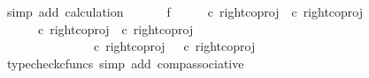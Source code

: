 \begin{isabellebody}
\ {\isacharparenleft}{\kern0pt}simp\ add{\isacharcolon}{\kern0pt}\ calculation{\isacharparenright}{\kern0pt}\isanewline
\ \ \isamarkupfalse%
\isanewline
\ \ \isamarkupfalse%
\ f{}{\isacharcolon}{\kern0pt}\ {\isachardoublequoteopen}{\isasymlangle}{\isasymt}{\isacharcomma}{\kern0pt}{\isasymt}{\isasymrangle}\ {\isasymamalg}\ {\isasymlangle}{\isasymt}{\isacharcomma}{\kern0pt}{\isasymf}{\isasymrangle}\ {\isasymamalg}\ {\isasymlangle}{\isasymf}{\isacharcomma}{\kern0pt}{\isasymt}{\isasymrangle}\ {\isasymcirc}\isactrlsub c\ {\isacharparenleft}{\kern0pt}right{\isacharunderscore}{\kern0pt}coproj\ {\isasymone}\ {\isacharparenleft}{\kern0pt}{\isasymone}{\isasymCoprod}{\isasymone}{\isacharparenright}{\kern0pt}{\isasymcirc}\isactrlsub c\ right{\isacharunderscore}{\kern0pt}coproj\ {\isasymone}\ {\isasymone}{\isacharparenright}{\kern0pt}\ {\isacharequal}{\kern0pt}\ {\isasymlangle}{\isasymf}{\isacharcomma}{\kern0pt}{\isasymt}{\isasymrangle}{\isachardoublequoteclose}\isanewline
\ \ \isamarkupfalse%
{\isacharminus}{\kern0pt}\ \isanewline
\ \ \ \ \isamarkupfalse%
\ {\isachardoublequoteopen}{\isasymlangle}{\isasymt}{\isacharcomma}{\kern0pt}{\isasymt}{\isasymrangle}\ {\isasymamalg}\ {\isasymlangle}{\isasymt}{\isacharcomma}{\kern0pt}{\isasymf}{\isasymrangle}\ {\isasymamalg}\ {\isasymlangle}{\isasymf}{\isacharcomma}{\kern0pt}{\isasymt}{\isasymrangle}\ {\isasymcirc}\isactrlsub c\ {\isacharparenleft}{\kern0pt}right{\isacharunderscore}{\kern0pt}coproj\ {\isasymone}\ {\isacharparenleft}{\kern0pt}{\isasymone}{\isasymCoprod}{\isasymone}{\isacharparenright}{\kern0pt}{\isasymcirc}\isactrlsub c\ right{\isacharunderscore}{\kern0pt}coproj\ {\isasymone}\ {\isasymone}{\isacharparenright}{\kern0pt}\ {\isacharequal}{\kern0pt}\ \isanewline
\ \ \ \ \ \ \ \ \ \ {\isacharparenleft}{\kern0pt}{\isasymlangle}{\isasymt}{\isacharcomma}{\kern0pt}{\isasymt}{\isasymrangle}\ {\isasymamalg}\ {\isasymlangle}{\isasymt}{\isacharcomma}{\kern0pt}{\isasymf}{\isasymrangle}\ {\isasymamalg}\ {\isasymlangle}{\isasymf}{\isacharcomma}{\kern0pt}{\isasymt}{\isasymrangle}\ {\isasymcirc}\isactrlsub c\ right{\isacharunderscore}{\kern0pt}coproj\ {\isasymone}\ {\isacharparenleft}{\kern0pt}{\isasymone}{\isasymCoprod}{\isasymone}{\isacharparenright}{\kern0pt}\ {\isacharparenright}{\kern0pt}{\isasymcirc}\isactrlsub c\ right{\isacharunderscore}{\kern0pt}coproj\ {\isasymone}\ {\isasymone}{\isachardoublequoteclose}\isanewline
\ \ \ \ \ \ \isamarkupfalse%
\ {\isacharparenleft}{\kern0pt}typecheck{\isacharunderscore}{\kern0pt}cfuncs{\isacharcomma}{\kern0pt}\ simp\ add{\isacharcolon}{\kern0pt}\ comp{\isacharunderscore}{\kern0pt}associative{}{\isacharparenright}{\kern0pt}\isanewline

\end{isabellebody}
